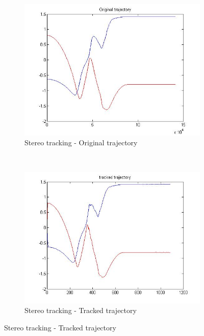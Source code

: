 \begin{figure}[hp]
	\centering
	\begin{subfigure}[hp]{0.48\linewidth}
		\centering
		\includegraphics[width=\linewidth]{../Images/c3/sim3_traj_ori}
		\caption{Stereo tracking - Original trajectory}
		\label{fig:sim3_traj_ori}
	\end{subfigure}
	~
	\begin{subfigure}[hp]{0.48\linewidth}
		\centering
		\includegraphics[width=\linewidth]{../Images/c3/sim3_traj_track}
		\caption{Stereo tracking - Tracked trajectory}
		\label{fig:sim3_traj_track}
	\end{subfigure}
\end{figure}


